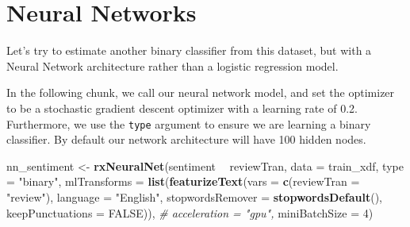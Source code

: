 \documentclass[]{book}
\newenvironment{Shaded}{\begin{snugshade}}{\end{snugshade}}
\newcommand{\KeywordTok}[1]{\textcolor[rgb]{0.13,0.29,0.53}{\textbf{#1}}}
\newcommand{\DataTypeTok}[1]{\textcolor[rgb]{0.13,0.29,0.53}{#1}}
\newcommand{\DecValTok}[1]{\textcolor[rgb]{0.00,0.00,0.81}{#1}}
\newcommand{\StringTok}[1]{\textcolor[rgb]{0.31,0.60,0.02}{#1}}
\newcommand{\CommentTok}[1]{\textcolor[rgb]{0.56,0.35,0.01}{\textit{#1}}}
\newcommand{\OtherTok}[1]{\textcolor[rgb]{0.56,0.35,0.01}{#1}}
\newcommand{\OperatorTok}[1]{\textcolor[rgb]{0.81,0.36,0.00}{\textbf{#1}}}
\newcommand{\NormalTok}[1]{#1}
\theoremstyle{definition}
\theoremstyle{definition}
\theoremstyle{definition}
\theoremstyle{remark}
\begin{document}
\section{Neural Networks}\label{neural-networks}

Let's try to estimate another binary classifier from this dataset, but
with a Neural Network architecture rather than a logistic regression
model.

In the following chunk, we call our neural network model, and set the
optimizer to be a stochastic gradient descent optimizer with a learning
rate of 0.2. Furthermore, we use the \texttt{type} argument to ensure we
are learning a binary classifier. By default our network architecture
will have 100 hidden nodes.

\begin{Shaded}
\begin{Highlighting}[]
\NormalTok{nn_sentiment <-}\StringTok{ }\KeywordTok{rxNeuralNet}\NormalTok{(sentiment }\OperatorTok{~}\StringTok{ }\NormalTok{reviewTran,}
                            \DataTypeTok{data =}\NormalTok{ train_xdf,}
                            \DataTypeTok{type =} \StringTok{"binary"}\NormalTok{,}
                            \DataTypeTok{mlTransforms =} \KeywordTok{list}\NormalTok{(}\KeywordTok{featurizeText}\NormalTok{(}\DataTypeTok{vars =} \KeywordTok{c}\NormalTok{(}\DataTypeTok{reviewTran =} \StringTok{"review"}\NormalTok{),}
                                                         \DataTypeTok{language =} \StringTok{"English"}\NormalTok{,}
                                                         \DataTypeTok{stopwordsRemover =} \KeywordTok{stopwordsDefault}\NormalTok{(),}
                                                         \DataTypeTok{keepPunctuations =} \OtherTok{FALSE}\NormalTok{)),}
                          \CommentTok{# acceleration = "gpu",}
                          \DataTypeTok{miniBatchSize =} \DecValTok{4}\NormalTok{)}
\end{Highlighting}
\end{Shaded}
\end{document}
